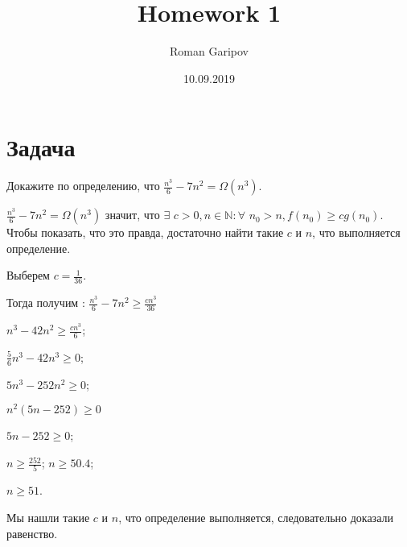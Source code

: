 \documentclass{article}
\title{Homework 1}
\date{10.09.2019}
\author{Roman Garipov}
\begin{document}
  \maketitle %
  \newpage %

\section{Задача }
Докажите по определению, что 	$ \frac{n^{3}}{6} - 7n^{2} = \Omega(n^{3})$.
$$$$


   $ \frac{n^{3}}{6} - 7n^{2} = \Omega(n^{3})$ значит, что $ \exists $ $c > 0,  n \in \mathbb{N}: \forall$ $n_{0} > n, f(n_{0}) \geqslant cg(n_{0})$. 
   Чтобы показать, что это правда, достаточно найти такие $c$ и $n$, что выполняется определение. 
   
	Выберем $c = \frac{1}{36}$. 
   
   Тогда получим : $ \frac{n^{3}}{6} - 7n^{2} \geqslant \frac{cn^{3}}{36} $
   
    $n^{3} - 42n^{2} \geqslant \frac{cn^{3}}{6}$; 
    
    $\frac{5}{6}n^{3} - 42n^{3} \geqslant 0$;
    
     $5n^{3} - 252n^{2} \geqslant 0$; 
     
      $n^{2}(5n - 252) \geqslant 0$ 
    
     $5n - 252 \geqslant 0$; 
     
     $n \geqslant \frac{252}{5}$; $ n \geqslant 50.4$; 
     
     $n \geqslant 51$.
     
      Мы нашли такие $c$ и $n$, что определение выполняется, следовательно доказали равенство.
\end{document}
